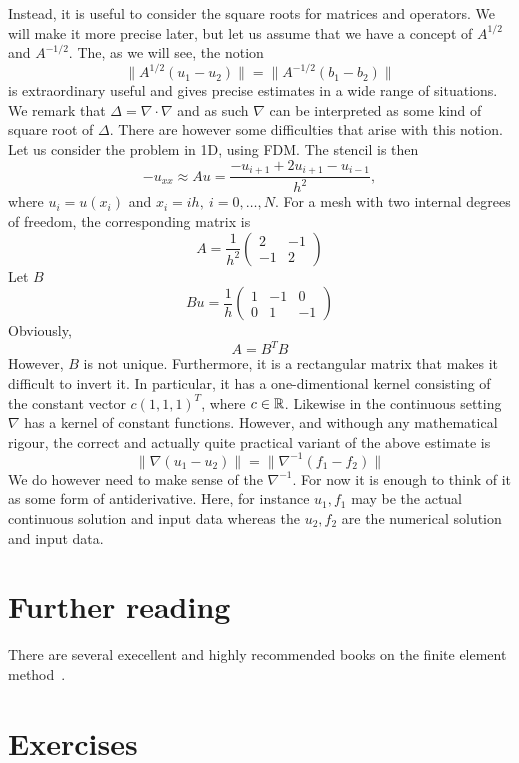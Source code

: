 Instead, it is useful to consider the square roots for matrices and operators. 
We will make it more precise later, but let us assume 
that we have a concept of 
$A^{1/2}$ and $A^{-1/2}$. The, as we will see,  the notion 
\[
	\|A^{1/2}(u_1 - u_2) \| = \|A^{-1/2}(b_1 - b_2)\|     
\]
is extraordinary useful and gives precise estimates in a wide range of situations.  
We remark that $\Delta=\nabla\cdot\nabla$ and as such $\nabla$ can be interpreted
as some kind of square root of $\Delta$. There are however some difficulties that
arise with this notion. Let us consider the problem in 1D, using FDM. The stencil 
is then 
\[
- u_{xx} \approx A u =  \frac{-u_{i+1} + 2 u_{i+1}  -u_{i-1}}{h^2}, 
\]  
where $u_i= u(x_i)$ and $x_i = ih, \ i=0,\ldots, N$. 
For a mesh with two internal degrees of freedom, the corresponding matrix 
is 
\[
A = 
\frac{1}{h^2}\begin{pmatrix}
2 & -1 \\ -1 & 2 
\end{pmatrix}
\]
Let $B$ 
\[
B u = 
\frac{1}{h}\begin{pmatrix}
1 & -1 & 0  \\ 0 & 1 & -1  
\end{pmatrix}
\]
Obviously,  
\[
A = B^T B 
\]
However, $B$ is not unique. Furthermore, it is a rectangular matrix that makes
it difficult to invert it. In particular, it has a one-dimentional kernel
consisting of the constant vector $c (1,1,1)^T$, where $c\in \mathbb{R}$. Likewise
in the continuous setting $\nabla$ has a kernel of constant functions.  
However, and withough any mathematical rigour, 
the correct and actually quite practical 
variant of the above estimate is    
\[
\|\nabla (u_1 - u_2) \| = \|\nabla^{-1}(f_1 - f_2)\|     
\]
We do however need to make sense of the 
$\nabla^{-1}$. For now it is enough to think of it as some form of antiderivative. 
Here, for instance $u_1, f_1$ may be the actual continuous solution and input data whereas the 
$u_2, f_2$ are the numerical solution and input data. 

\section{Further reading}
There are several execellent and highly recommended books on the finite element method~\cite{braess2007finite, brenner2008mathematical}. 


\section{Exercises}

